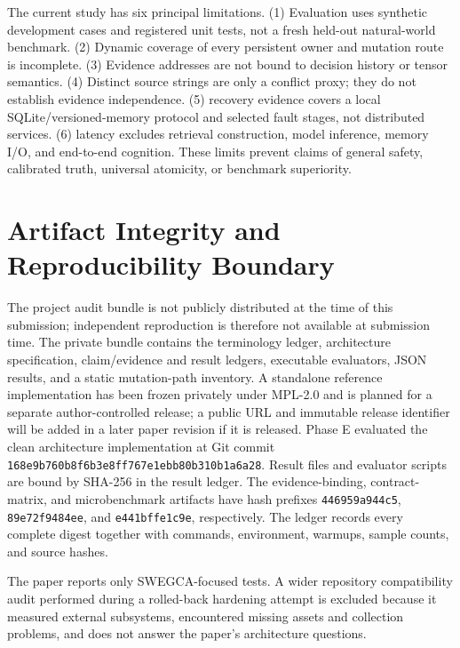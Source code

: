 \documentclass[10pt]{article}
\newcommand{\swegca}{\textsc{SWEGCA}}
\newcommand{\code}[1]{\texttt{#1}}
\begin{document}
The current study has six principal limitations. (1) Evaluation uses synthetic development cases and registered unit tests, not a fresh held-out natural-world benchmark. (2) Dynamic coverage of every persistent owner and mutation route is incomplete. (3) Evidence addresses are not bound to decision history or tensor semantics. (4) Distinct source strings are only a conflict proxy; they do not establish evidence independence. (5) recovery evidence covers a local SQLite/versioned-memory protocol and selected fault stages, not distributed services. (6) latency excludes retrieval construction, model inference, memory I/O, and end-to-end cognition. These limits prevent claims of general safety, calibrated truth, universal atomicity, or benchmark superiority.

\section{Artifact Integrity and Reproducibility Boundary}

The project audit bundle is not publicly distributed at the time of this submission; independent reproduction is therefore not available at submission time. The private bundle contains the terminology ledger, architecture specification, claim/evidence and result ledgers, executable evaluators, JSON results, and a static mutation-path inventory. A standalone reference implementation has been frozen privately under MPL-2.0 and is planned for a separate author-controlled release; a public URL and immutable release identifier will be added in a later paper revision if it is released. Phase E evaluated the clean architecture implementation at Git commit \code{168e9b760b8f6b3e8ff767e1ebb80b310b1a6a28}. Result files and evaluator scripts are bound by SHA-256 in the result ledger. The evidence-binding, contract-matrix, and microbenchmark artifacts have hash prefixes \code{446959a944c5}, \code{89e72f9484ee}, and \code{e441bffe1c9e}, respectively. The ledger records every complete digest together with commands, environment, warmups, sample counts, and source hashes.

The paper reports only \swegca-focused tests. A wider repository compatibility audit performed during a rolled-back hardening attempt is excluded because it measured external subsystems, encountered missing assets and collection problems, and does not answer the paper's architecture questions.
\end{document}
